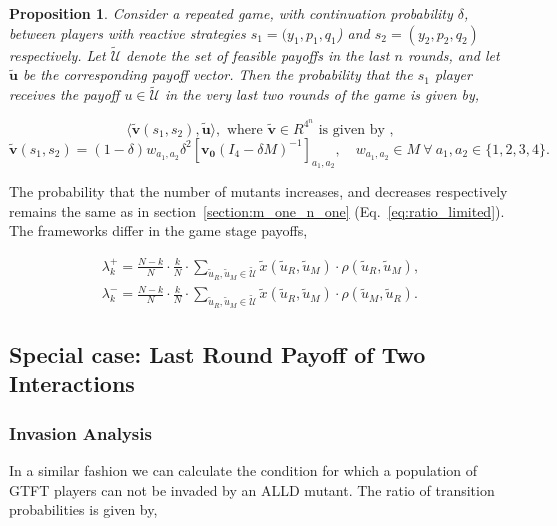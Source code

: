 \documentclass[11pt]{article}
\theoremstyle{plainCl1}
\newtheorem{Prop}{Proposition}
\theoremstyle{plainCl2}
\begin{document}
\begin{Prop}\label{proposition:last_m_rounds} Consider a repeated game, with
  continuation probability $\delta$, between players with reactive strategies
  $s_1\!=\!(y_1, p_1, q_1$) and $s_2\!=\!(y_2,p_2,q_2)$ respectively. Let
  $\mathcal{\tilde{U}}$ denote the set of feasible payoffs in the last
  \(n\) rounds, and let \(\tilde{\mathbf{u}}\) be the corresponding payoff vector.
  Then the probability that the $s_1$ player receives the payoff $u\!\in\!
  \mathcal{\tilde{U}}$ in the very last two rounds of the game is given by,

  \begin{equation}
  \langle\mathbf{\tilde{v}}(s_1,s_2),\mathbf{\tilde{u}}\rangle, \text{ where } \mathbf{\tilde{v}} \in R^{4^{n}} \text{ is given by },
  \end{equation}
  \begin{equation}
    \mathbf{\tilde{v}}(s_1,s_2) = (1 - \delta) w_{a_1, a_2} \delta^2 \left[\mathbf{v_0}(I_4 - \delta M)^{-1}\right]_{a_1, a_2}, \quad  w_{a_1, a_2} \in M \ \forall \ a_1, a_2 \in \{1, 2, 3, 4\}.
  \end{equation}
\end{Prop}

The probability that the number of mutants increases, and decreases respectively
remains the same as in section~\ref{section:m_one_n_one} (Eq.~\ref{eq:ratio_limited}). The
frameworks differ in the game stage payoffs,

\begin{align}
  \lambda^+_k=\frac{N\!-\!k}{N}\cdot \frac{k}{N}\cdot \sum_{\tilde{u}_{R},\tilde{u}_{M}\in\mathcal{\tilde{U}}} \tilde{x}(\tilde{u}_{R},\tilde{u}_{M})\cdot \rho(\tilde{u}_{R},\tilde{u}_{M}), \\
  \lambda^-_k=\frac{N\!-\!k}{N}\cdot \frac{k}{N}\cdot \sum_{\tilde{u}_{R},\tilde{u}_{M}\in\mathcal{\tilde{U}}} \tilde{x}(\tilde{u}_{R},\tilde{u}_{M})\cdot \rho(\tilde{u}_{M},\tilde{u}_{R}).
\end{align}

\subsection*{Special case: Last Round Payoff of Two Interactions}

\subsubsection*{Invasion Analysis}

In a similar fashion we can calculate the condition for which a population of
GTFT players can not be invaded by an ALLD mutant. The ratio of transition
probabilities is given by,
\end{document}
